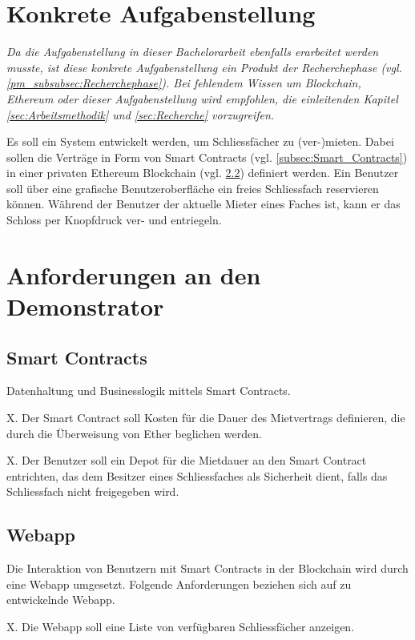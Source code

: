\section{Konkrete Aufgabenstellung}
\label{sec:Konkrete_Aufgabenstellung}
\emph{Da die Aufgabenstellung in dieser Bachelorarbeit ebenfalls erarbeitet werden musste, ist diese konkrete Aufgabenstellung ein Produkt der Recherchephase (vgl. \ref{pm_subsubsec:Recherchephase}). Bei fehlendem Wissen um Blockchain, Ethereum oder dieser Aufgabenstellung wird empfohlen, die einleitenden Kapitel \ref{sec:Arbeitsmethodik} und \ref{sec:Recherche} vorzugreifen.}

Es soll ein System entwickelt werden, um Schliessfächer zu (ver-)mieten. Dabei sollen die Verträge in Form von Smart Contracts (vgl. \ref{subsec:Smart_Contracts}) in einer privaten Ethereum Blockchain (vgl. \ref{}) definiert werden. Ein Benutzer soll über eine grafische Benutzeroberfläche ein freies Schliessfach reservieren können. Während der Benutzer der aktuelle Mieter eines Faches ist, kann er das Schloss per Knopfdruck ver- und entriegeln.

\section{Anforderungen an den Demonstrator}
\label{sec:Anforderungen_Demonstrator}

\subsection{Smart Contracts}
Datenhaltung und Businesslogik mittels Smart Contracts.

X. Der Smart Contract soll Kosten für die Dauer des Mietvertrags definieren, die durch die Überweisung von Ether beglichen werden.

X. Der Benutzer soll ein Depot für die Mietdauer an den Smart Contract entrichten, das dem Besitzer eines Schliessfaches als Sicherheit dient, falls das Schliessfach nicht freigegeben wird.

\subsection{Webapp}
Die Interaktion von Benutzern mit Smart Contracts in der Blockchain wird durch eine Webapp umgesetzt. Folgende Anforderungen beziehen sich auf zu entwickelnde Webapp.\cite[Wiki/DAPP-Developer-Resources, Wiki/Useful-Dapp-Patterns]{github.com/ethereum}

X. Die Webapp soll eine Liste von verfügbaren Schliessfächer anzeigen.

